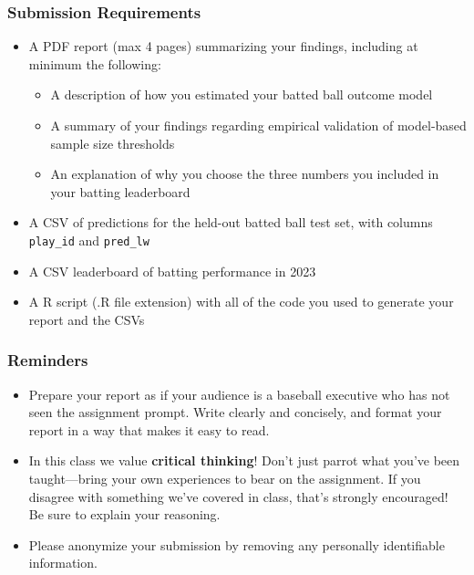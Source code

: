 \documentclass{article}
\begin{document}
      \subsubsection*{\sc Submission Requirements}

        \begin{itemize}
          \item A PDF report (max 4 pages) summarizing your findings, including at minimum the following:
          \begin{itemize}
            \item A description of how you estimated your batted ball outcome model
            \item A summary of your findings regarding empirical validation of model-based sample size thresholds
            \item An explanation of why you choose the three numbers you included in your batting leaderboard
          \end{itemize}
          \item A CSV of predictions for the held-out batted ball test set, with columns \texttt{play\_id} and \texttt{pred\_lw}
          \item A CSV leaderboard of batting performance in 2023
          \item A R script (.R file extension) with all of the code you used to generate your report and the CSVs
        \end{itemize}

      \subsubsection*{\sc Reminders}

        \begin{itemize}
          \item Prepare your report as if your audience is a baseball executive who has not seen the assignment prompt. Write clearly and concisely, and format your report in a way that makes it easy to read.
          \item In this class we value {\bf critical thinking}! Don't just parrot what you've been taught---bring your own experiences to bear on the assignment. If you disagree with something we've covered in class, that's strongly encouraged! Be sure to explain your reasoning.
          \item Please anonymize your submission by removing any personally identifiable information.
        \end{itemize}
\end{document}
